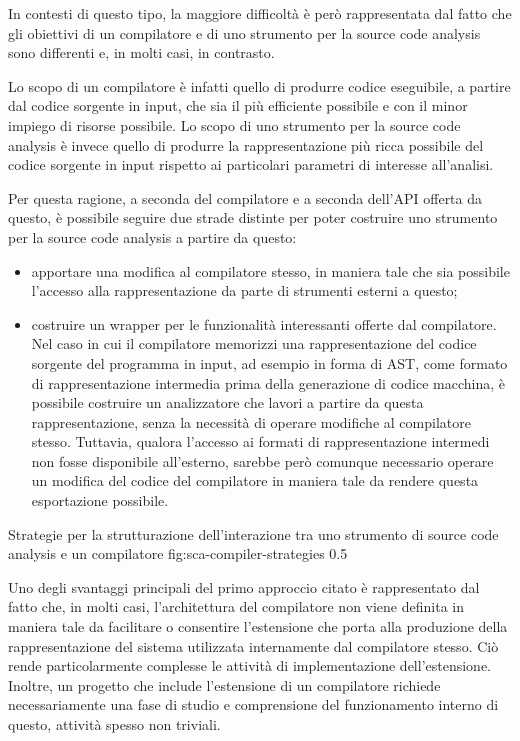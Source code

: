 In contesti di questo tipo, la maggiore difficoltà è però rappresentata dal
fatto che gli obiettivi di un compilatore e di uno strumento per la source code
analysis sono differenti e, in molti casi, in contrasto.

Lo scopo di un compilatore è infatti quello di produrre codice eseguibile, a
partire dal codice sorgente in input, che sia il più efficiente possibile e con
il minor impiego di risorse possibile. Lo scopo di uno strumento per la source
code analysis è invece quello di produrre la rappresentazione più ricca
possibile del codice sorgente in input rispetto ai particolari parametri di
interesse all’analisi.

Per questa ragione, a seconda del compilatore e a seconda dell’API offerta da
questo, è possibile seguire due strade distinte per poter costruire uno
strumento per la source code analysis a partire da questo:

\begin{itemize}

\item apportare una modifica al compilatore stesso, in maniera tale che sia
possibile l'accesso alla rappresentazione da parte di strumenti esterni a
questo;

\item costruire un wrapper per le funzionalità interessanti offerte dal
compilatore. Nel caso in cui il compilatore memorizzi una rappresentazione del
codice sorgente del programma in input, ad esempio in forma di AST, come formato
di rappresentazione intermedia prima della generazione di codice macchina, è
possibile costruire un analizzatore che lavori a partire da questa
rappresentazione, senza la necessità di operare modifiche al compilatore stesso.
Tuttavia, qualora l’accesso ai formati di rappresentazione intermedi non fosse
disponibile all’esterno, sarebbe però comunque necessario operare un modifica
del codice del compilatore in maniera tale da rendere questa esportazione
possibile.

\end{itemize}

      {Strategie per la strutturazione dell'interazione tra uno strumento di
      source code analysis e un compilatore}
      {fig:sca-compiler-strategies}
      {0.5}

Uno degli svantaggi principali del primo approccio citato è rappresentato dal
fatto che, in molti casi, l'architettura del compilatore non viene definita in
maniera tale da facilitare o consentire l'estensione che porta alla produzione
della rappresentazione del sistema utilizzata internamente dal compilatore
stesso. Ciò rende particolarmente complesse le attività di implementazione
dell'estensione. Inoltre, un progetto che include l'estensione di un compilatore
richiede necessariamente una fase di studio e comprensione del funzionamento
interno di questo, attività spesso non triviali.\\

